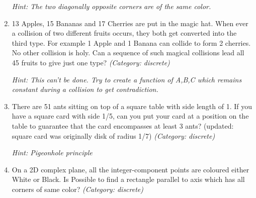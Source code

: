 \begin{enumerate}
\small\emph{Hint: The two diagonally opposite corners are of the same color.}





\item 13 Apples, 15 Bananas and 17 Cherries are put in the magic hat. When ever a collision of two different fruits occurs, they both get converted into the third type. For example 1 Apple and 1 Banana can collide to form 2 cherries. No other collision is holy. Can a sequence of such magical collisions lead all 45 fruits to give just one type?
\small\emph{(Category: discrete)}

\small\emph{Hint: This can't be done. Try to create a function of A,B,C which remains constant during a collision to get contradiction.}





\item There are 51 ants sitting on top of a square table with side length of 1. If you have a square card with side 1/5, can you put your card at a position on the table to guarantee that the card encompasses at least 3 ants?
(updated: square card was originally disk of radius 1/7)
\small\emph{(Category: discrete)}

\small\emph{Hint: Pigeonhole principle}





\item On a 2D complex plane, all the integer-component points are coloured either White or Black. Is Possible to find a rectangle parallel to axis which has all corners of same color?
\small\emph{(Category: discrete)}





\end{enumerate}
